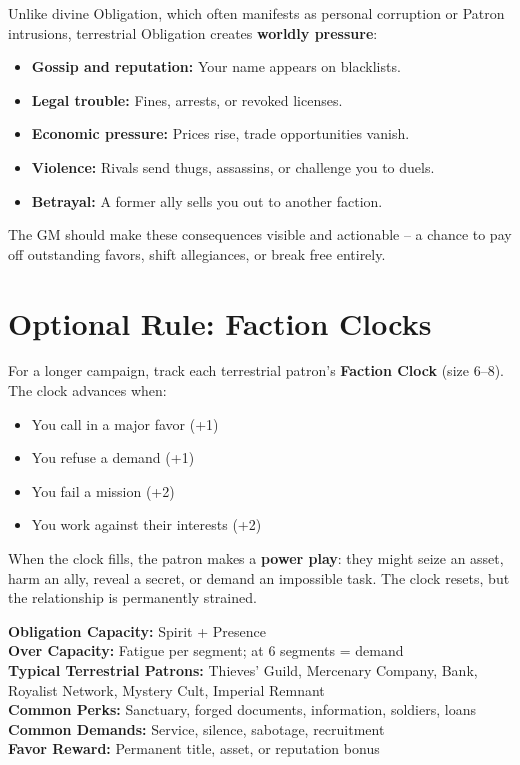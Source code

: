 Unlike divine Obligation, which often manifests as personal corruption or Patron intrusions, terrestrial Obligation creates \textbf{worldly pressure}:
\begin{itemize}
  \item \textbf{Gossip and reputation:} Your name appears on blacklists.
  \item \textbf{Legal trouble:} Fines, arrests, or revoked licenses.
  \item \textbf{Economic pressure:} Prices rise, trade opportunities vanish.
  \item \textbf{Violence:} Rivals send thugs, assassins, or challenge you to duels.
  \item \textbf{Betrayal:} A former ally sells you out to another faction.
\end{itemize}

The GM should make these consequences visible and actionable – a chance to pay off outstanding favors, shift allegiances, or break free entirely.

\section{Optional Rule: Faction Clocks}

For a longer campaign, track each terrestrial patron’s \textbf{Faction Clock} (size 6–8). The clock advances when:
\begin{itemize}
  \item You call in a major favor (+1)
  \item You refuse a demand (+1)
  \item You fail a mission (+2)
  \item You work against their interests (+2)
\end{itemize}

When the clock fills, the patron makes a \textbf{power play}: they might seize an asset, harm an ally, reveal a secret, or demand an impossible task. The clock resets, but the relationship is permanently strained.

\begin{tcolorbox}[colback=gray!5!white,colframe=gray!75!black,title=World Powers Quick Reference,fonttitle=\bfseries]
\textbf{Obligation Capacity:} Spirit + Presence \\
\textbf{Over Capacity:} Fatigue per segment; at 6 segments = demand \\
\textbf{Typical Terrestrial Patrons:} Thieves’ Guild, Mercenary Company, Bank, Royalist Network, Mystery Cult, Imperial Remnant \\
\textbf{Common Perks:} Sanctuary, forged documents, information, soldiers, loans \\
\textbf{Common Demands:} Service, silence, sabotage, recruitment \\
\textbf{Favor Reward:} Permanent title, asset, or reputation bonus
\end{tcolorbox}

